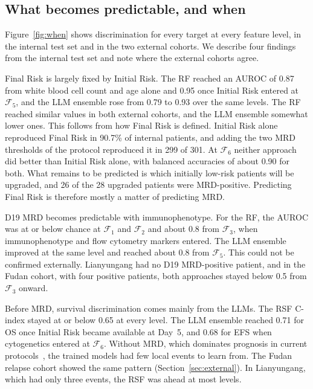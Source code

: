 \documentclass[pdflatex,sn-nature]{sn-jnl}
\begin{document}
\subsection{What becomes predictable, and when}
\label{sec:when}

Figure~\ref{fig:when} shows discrimination for every target at every
feature level, in the internal test set and in the two external
cohorts.
We describe four findings from the internal test set and note where
the external cohorts agree.

Final Risk is largely fixed by Initial Risk.
The RF reached an AUROC of 0.87 from white blood cell count and age
alone and 0.95 once Initial Risk entered at $\mathcal{F}_5$, and the
LLM ensemble rose from 0.79 to 0.93 over the same levels.
The RF reached similar values in both external cohorts, and the LLM
ensemble somewhat lower ones.
This follows from how Final Risk is defined.
Initial Risk alone reproduced Final Risk in 90.7\% of internal
patients, and adding the two MRD thresholds of the protocol reproduced
it in 299 of 301.
At $\mathcal{F}_6$ neither approach did better than Initial Risk alone,
with balanced accuracies of about 0.90 for both.
What remains to be predicted is which initially low-risk patients will
be upgraded, and 26 of the 28 upgraded patients were MRD-positive.
Predicting Final Risk is therefore mostly a matter of predicting MRD.

D19 MRD becomes predictable with immunophenotype.
For the RF, the AUROC was at or below chance at $\mathcal{F}_1$ and
$\mathcal{F}_2$ and about 0.8 from $\mathcal{F}_3$, when
immunophenotype and flow cytometry markers entered.
The LLM ensemble improved at the same level and reached about 0.8 from
$\mathcal{F}_5$.
This could not be confirmed externally.
Lianyungang had no D19 MRD-positive patient, and in the Fudan cohort,
with four positive patients, both approaches stayed below 0.5 from
$\mathcal{F}_3$ onward.

Before MRD, survival discrimination comes mainly from the LLMs.
The RSF C-index stayed at or below 0.65 at every level.
The LLM ensemble reached 0.71 for OS once Initial Risk became
available at Day~5, and 0.68 for EFS when cytogenetics entered at
$\mathcal{F}_6$.
Without MRD, which dominates prognosis in current
protocols~\cite{[CITE:Borowitz2008],[CITE:Conter2010]}, the trained
models had few local events to learn from.
The Fudan relapse cohort showed the same pattern
(Section~\ref{sec:external}).
In Lianyungang, which had only three events, the RSF was ahead at most
levels.
\end{document}
